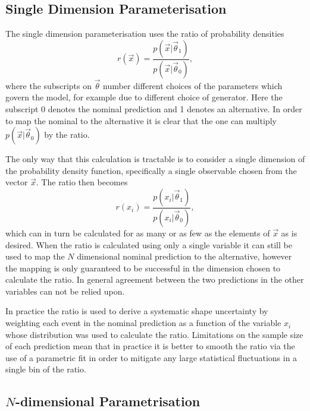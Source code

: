 \subsection{Single Dimension Parameterisation}
\label{sec:1D-reweight}

The single dimension parameterisation uses the ratio of probability densities
\begin{equation}
  r(\vec{x}) = \frac{p(\vec{x}|\vec{\theta}_{1})}{p(\vec{x}|\vec{\theta}_{0})},
  \label{eq:DensityRatio}
\end{equation}
where the subscripts on $\vec{\theta}$ number different choices of the
parameters which govern the model, for example due to different choice of
generator. Here the subscript 0 denotes the nominal prediction and 1 denotes an
alternative. In order to map the nominal to the alternative it is clear that the
one can multiply $p(\vec{x}|\vec{\theta}_{0})$ by the ratio.

The only way that this calculation is tractable is to consider a single
dimension of the probability density function, specifically a single observable
chosen from the vector $\vec{x}$. The ratio then becomes
\begin{equation}
  r(x_{i}) = \frac{p(x_{i}|\vec{\theta}_{1})}{p(x_{i}|\vec{\theta}_{0})},
  \label{eq:1D-ratio}
\end{equation}
which can in turn be calculated for as many or as few as the elements of
$\vec{x}$ as is desired. When the ratio is calculated using only a single
variable it can still be used to map the $N$ dimensional nominal prediction to
the alternative, however the mapping is only guaranteed to be successful in the
dimension chosen to calculate the ratio. In general agreement between the two
predictions in the other variables can not be relied upon.

In practice the ratio is used to derive a systematic shape uncertainty by
weighting each event in the nominal prediction as a function of the variable
$x_{i}$ whose distribution was used to calculate the ratio. Limitations on the
sample size of each prediction mean that in practice it is better to smooth the
ratio via the use of a parametric fit in order to mitigate any large statistical
fluctuations in a single bin of the ratio.

\subsection{$N$-dimensional Parametrisation}
\label{sec:ND-reweight}

